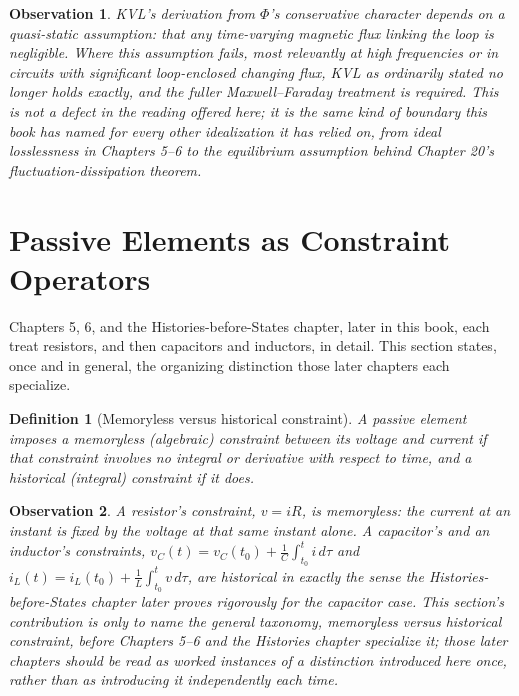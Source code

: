 \documentclass[12pt]{article}
\newtheorem{definition}{Definition}
\newtheorem{observation}{Observation}
\begin{document}
\begin{observation}
KVL's derivation from $\Phi$'s conservative character depends on a quasi-static assumption: that any time-varying magnetic flux linking the loop is negligible. Where this assumption fails, most relevantly at high frequencies or in circuits with significant loop-enclosed changing flux, KVL as ordinarily stated no longer holds exactly, and the fuller Maxwell--Faraday treatment is required. This is not a defect in the reading offered here; it is the same kind of boundary this book has named for every other idealization it has relied on, from ideal losslessness in Chapters 5--6 to the equilibrium assumption behind Chapter 20's fluctuation-dissipation theorem.
\end{observation}

\section{Passive Elements as Constraint Operators}

Chapters 5, 6, and the Histories-before-States chapter, later in this book, each treat resistors, and then capacitors and inductors, in detail. This section states, once and in general, the organizing distinction those later chapters each specialize.

\begin{definition}[Memoryless versus historical constraint]
A passive element imposes a \emph{memoryless} (algebraic) constraint between its voltage and current if that constraint involves no integral or derivative with respect to time, and a \emph{historical} (integral) constraint if it does.
\end{definition}

\begin{observation}
A resistor's constraint, $v = iR$, is memoryless: the current at an instant is fixed by the voltage at that same instant alone. A capacitor's and an inductor's constraints, $v_C(t) = v_C(t_0) + \frac{1}{C}\int_{t_0}^t i\,d\tau$ and $i_L(t) = i_L(t_0) + \frac{1}{L}\int_{t_0}^t v\,d\tau$, are historical in exactly the sense the Histories-before-States chapter later proves rigorously for the capacitor case. This section's contribution is only to name the general taxonomy, memoryless versus historical constraint, before Chapters 5--6 and the Histories chapter specialize it; those later chapters should be read as worked instances of a distinction introduced here once, rather than as introducing it independently each time.
\end{observation}
\end{document}

